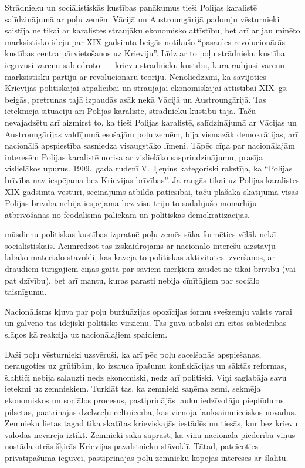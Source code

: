 \documentclass[twoside,a5paper,12pt,fleqn,openany]{extbook}
\begin{document}
Strādnieku un sociālistiskās kustības panākumus tieši Polijas karalistē salīdzinājumā ar poļu zemēm Vācijā un Austroungārijā padomju vēsturnieki saistīja ne tikai ar karalistes straujāku ekonomisko attīstību, bet arī ar jau minēto marksistisko ideju par XIX gadsimta beigās notikušo ``pasaules revolucionārās kustības centra pārvietošanos uz Krieviju''. Līdz ar to poļu strādnieku kustība ieguvusi varenu sabiedroto~--- krievu strādnieku kustību, kura radījusi varenu marksistisku partiju ar revolucionāru teoriju. Nenoliedzami, ka savijoties Krievijas politiskajai atpalicībai un straujajai ekonomiskajai attīstībai XIX~gs. beigās, pretrunas tajā izpaudās asāk nekā Vācijā un Austroungārijā. Tas ietekmēja situāciju arī Polijas karalistē, strādnieku kustību tajā. Taču nevajadzētu arī aizmirst to, ka tieši Polijas karalistē, salīdzinājumā ar Vācijas un Austroungārijas valdījumā esošajām poļu zemēm, bija vismazāk demokrātijas, arī nacionālā apspiestība sasniedza visaugstāko līmeni. Tāpēc cīņa par nacionālajām interesēm Polijas karalistē norisa ar vislielāko sasprindzinājumu, prasīja vislielākos upurus. 1909.~gada rudenī V.~Ļeņins kategoriski rakstīja, ka ``Polijas brīvība nav iespējama bez Krievijas brīvības''. Ja raugās tikai uz Polijas karalistes XIX gadsimta vēsturi, secinājums atbilda patiesībai, taču plašākā skatījumā visas Polijas brīvība nebija iespējama bez visu triju to sadalījušo monarhiju atbrīvošanās no feodālisma paliekām un politiskas demokratizācijas.

 mūsdienu politiskas kustības izpratnē poļu zemēs sāka formēties vēlāk nekā sociālistiskais. Acīmredzot tas izskaidrojams ar nacionālo interešu aizstāvju labāko materiālo stāvokli, kas kavēja to politiskās aktivitātes izvēršanos, ar draudiem turīgajiem cīņas gaitā par saviem mērķiem zaudēt ne tikai brīvību (vai pat dzīvību), bet arī mantu, kuras parasti nebija cīnītājiem par sociālo taisnīgumu.

Nacionālisms kļuva par poļu buržuāzijas opozīcijas formu svešzemju valsts varai un galveno tās idejiski politisko virzienu. Tas guva atbalsi arī citos sabiedrības slāņos kā reakcija uz nacionālajiem spaidiem.

Daži poļu vēsturnieki uzsvēruši, ka arī pēc poļu sacelšanās apspiešanas, neraugoties uz grūtībām, ko izsauca īpašumu konfiskācijas un sāktās reformas, šļahtiči nebija salauzti nedz ekonomiski, nedz arī politiski. Viņi saglabāja savu ietekmi uz zemniekiem. Turklāt tas, ka zemnieki saņēma zemi, sekmēja ekonomiskos un sociālos procesus, pastiprinājās lauku iedzīvotāju pieplūdums pilsētās, paātrinājās dzelzceļu celtniecība, kas vienoja lauksaimnieciskos novadus. Zemnieku lietas tagad tika skatītas krieviskajās iestādēs un tiesās, kur bez krievu valodas nevarēja iztikt. Zemnieki sāka saprast, ka viņu nacionālā piederība viņus nostāda otrās šķirās Krievijas pavalstnieku stāvoklī. Tātad, pateicoties privātīpašuma ieguvei, pastiprinājās poļu zemnieku kopējās intereses ar šļahtu.
\end{document}
